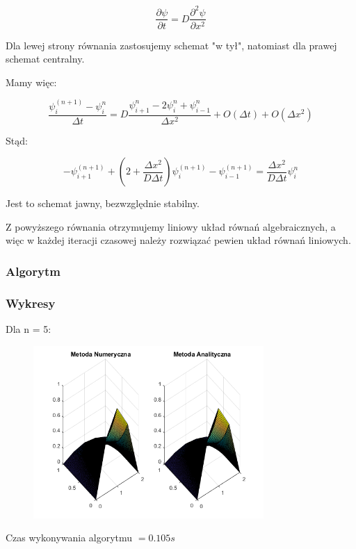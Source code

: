$$\dfrac{\partial \psi}{\partial t} = D\dfrac{\partial^2 \psi}{\partial x^2}$$

Dla lewej strony równania zastosujemy schemat "w tył", natomiast dla prawej schemat centralny.

Mamy więc:

$$\dfrac{\psi^{(n+1)}_{i}-\psi^n_{i}}{\Delta t}=D\dfrac{\psi^{n}_{i+1}-2\psi^n_{i}+\psi^n_{i-1}}{\Delta x^2} + O(\Delta t)+O(\Delta x^2)$$

Stąd:

$$-\psi^{(n+1)}_{i+1} + \left(2+\dfrac{\Delta x^2}{D \Delta t}\right) \psi^{(n+1)}_{i} -\psi^{(n+1)}_{i-1} =\dfrac{\Delta x^2}{D\Delta t}\psi^{n}_{i}$$

Jest to schemat jawny, bezwzględnie stabilny. 

Z powyższego równania otrzymujemy liniowy układ równań algebraicznych, a więc w każdej iteracji czasowej należy rozwiązać pewien układ równań liniowych.
\newpage
\subsubsection{Algorytm}

\newpage
\subsubsection{Wykresy}

Dla n = 5:

\begin{figure}[!ht]
	\begin{center}
		\includegraphics[width=0.78\textwidth]{Lab7/charts/btcs/5.png}
	\end{center}
\end{figure}

Czas wykonywania algorytmu $ = 0.105 s$

